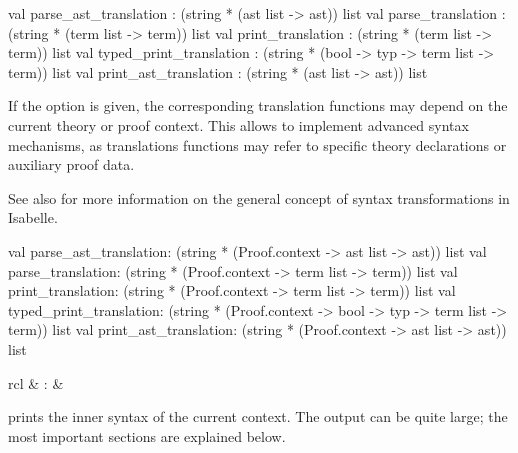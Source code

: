 \begin{isabellebody}
\begin{isamarkuptext}
\begin{ttbox}
val parse_ast_translation   : (string * (ast list -> ast)) list
val parse_translation       : (string * (term list -> term)) list
val print_translation       : (string * (term list -> term)) list
val typed_print_translation :
  (string * (bool -> typ -> term list -> term)) list
val print_ast_translation   : (string * (ast list -> ast)) list
\end{ttbox}

  If the  option is given, the corresponding
  translation functions may depend on the current theory or proof
  context.  This allows to implement advanced syntax mechanisms, as
  translations functions may refer to specific theory declarations or
  auxiliary proof data.

  See also \cite[\S8]{isabelle-ref} for more information on the
  general concept of syntax transformations in Isabelle.

\begin{ttbox}
val parse_ast_translation:
  (string * (Proof.context -> ast list -> ast)) list
val parse_translation:
  (string * (Proof.context -> term list -> term)) list
val print_translation:
  (string * (Proof.context -> term list -> term)) list
val typed_print_translation:
  (string * (Proof.context -> bool -> typ -> term list -> term)) list
val print_ast_translation:
  (string * (Proof.context -> ast list -> ast)) list
\end{ttbox}%
\end{isamarkuptext}%
\isamarkuptrue%
%
\isamarkuptrue%
%
\begin{isamarkuptext}%
\begin{matharray}{rcl}
    \hypertarget{command.print-syntax}{\hyperlink{command.print-syntax}{\mbox{}}}\isa{{\isachardoublequote}\isactrlsup {\isacharasterisk}{\isachardoublequote}} & : &  \\
  \end{matharray}

  \begin{description}

  \item \hyperlink{command.print-syntax}{\mbox{}} prints the inner syntax of the
  current context.  The output can be quite large; the most important
  sections are explained below.


\end{description}
\end{isamarkuptext}
\end{isabellebody}
